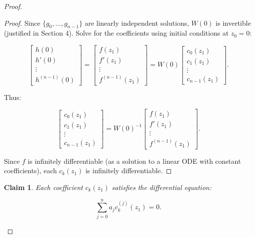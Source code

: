 \documentclass{article}
\newtheorem{claim}[theorem]{Claim}
\begin{document}
\begin{proof}
\begin{proof}
			Since \(\{g_0, \ldots, g_{n-1}\}\) are linearly independent solutions, \(W(0)\) is invertible (justified in Section 4). Solve for the coefficients using initial conditions at \(z_0 = 0\):
			
			\begin{equation}
				\begin{bmatrix} h(0) \\ h'(0) \\ \vdots \\ h^{(n-1)}(0) \end{bmatrix} = \begin{bmatrix} f(z_1) \\ f'(z_1) \\ \vdots \\ f^{(n-1)}(z_1) \end{bmatrix} = W(0) \begin{bmatrix} c_0(z_1) \\ c_1(z_1) \\ \vdots \\ c_{n-1}(z_1) \end{bmatrix}.
			\end{equation}
			
			Thus:
			
			\begin{equation}
				\begin{bmatrix} c_0(z_1) \\ c_1(z_1) \\ \vdots \\ c_{n-1}(z_1) \end{bmatrix} = W(0)^{-1} \begin{bmatrix} f(z_1) \\ f'(z_1) \\ \vdots \\ f^{(n-1)}(z_1) \end{bmatrix}.
			\end{equation}
			
			Since \(f\) is infinitely differentiable (as a solution to a linear ODE with constant coefficients), each \(c_k(z_1)\) is infinitely differentiable.
		\end{proof}
		
		\begin{claim}
			Each coefficient \(c_k(z_1)\) satisfies the differential equation:
			
			\begin{equation}
				\sum_{j=0}^n a_j c_k^{(j)}(z_1) = 0.
			\end{equation}
		\end{claim}
		

\end{proof}
\end{document}
